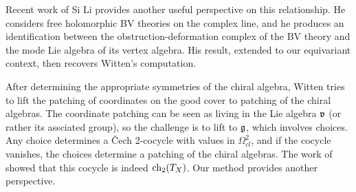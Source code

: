 \begin{rmk}
Recent work of Si Li \cite{LiQME} provides another useful perspective on this relationship.
He considers free holomorphic BV theories on the complex line,
and he produces an identification between the obstruction-deformation complex of the BV theory and the mode Lie algebra of its vertex algebra.
His result, extended to our equivariant context, then recovers Witten's computation. 
\end{rmk}

After determining the appropriate symmetries of the chiral algebra, 
Witten tries to lift the patching of coordinates on the good cover to patching of the chiral algebras.
The coordinate patching can be seen as living in the Lie algebra $\frak{v}$ (or rather its assciated group),
so the challenge is to lift to $\mathfrak g$, which involves choices.
Any choice determines a \v{C}ech 2-cocycle with values in $\Omega^2_{cl}$,
and if the cocycle vanishes,
the choices determine a patching of the chiral algebras.
The work of \cite{GMS} showed that this cocycle is indeed ${\rm ch}_2(T_X)$.
Our method provides another perspective.

%
%

